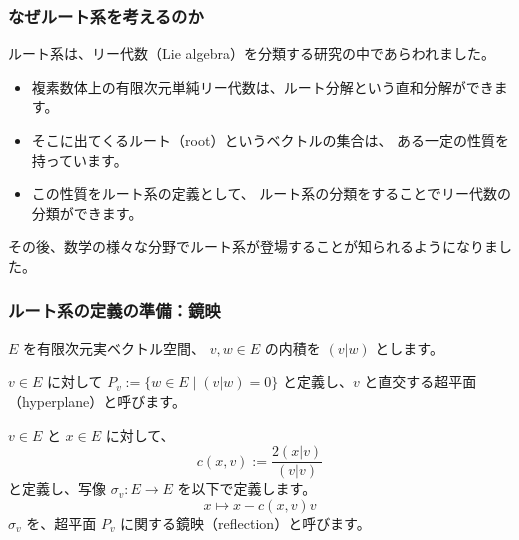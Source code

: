 \documentclass{beamer}
\begin{document}
\begin{frame}
    \frametitle{なぜルート系を考えるのか}

    ルート系は、リー代数（Lie algebra）を分類する研究の中であらわれました。

    \begin{itemize}
        \item 複素数体上の有限次元単純リー代数は、ルート分解という直和分解ができます。
        \item そこに出てくるルート（root）というベクトルの集合は、
              ある一定の性質を持っています。
        \item この性質をルート系の定義として、
              ルート系の分類をすることでリー代数の分類ができます。
    \end{itemize}

    その後、数学の様々な分野でルート系が登場することが知られるようになりました。
\end{frame}

\begin{frame}
    \frametitle{ルート系の定義の準備：鏡映}

    $E$ を有限次元実ベクトル空間、
    $v, w \in E$ の内積を $(v|w)$ とします。

    \begin{definition}[超平面]
        $v \in E$ に対して
        $P_v := \{ w \in E \mid (v|w) = 0 \}$
        と定義し、$v$ と直交する超平面（hyperplane）と呼びます。
    \end{definition}

    \begin{definition}[鏡映]
        $v \in E$ と $x \in E$ に対して、
        \[c(x,v) := \frac{2(x|v)}{(v|v)}\]
        と定義し、写像 $\sigma_v : E \to E$ を以下で定義します。
        \[x \mapsto x - c(x,v) v\]
        $\sigma_v$ を、超平面 $P_v$ に関する鏡映（reflection）と呼びます。
    \end{definition}
\end{frame}
\end{document}

